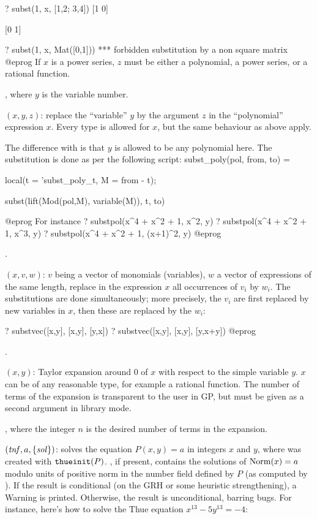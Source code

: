 \bprog
? subst(1, x, [1,2; 3,4])
[1 0]

[0 1]

? subst(1, x, Mat([0,1]))
  ***   forbidden substitution by a non square matrix
@eprog\noindent
If $x$ is a power series, $z$ must be either a polynomial, a power
series, or a rational function.

, where $y$ is the variable number.

$(x,y,z)$:
replace the ``variable'' $y$ by the argument $z$ in the ``polynomial''
expression $x$. Every type is allowed for $x$, but the same behaviour
as  above apply.

The difference with  is that $y$ is allowed to be any polynomial
here. The substitution is done as per the following script:
\bprog
   subst_poly(pol, from, to) =
   { local(t = 'subst_poly_t, M = from - t);

     subst(lift(Mod(pol,M), variable(M)), t, to)
   }
@eprog\noindent
For instance
\bprog
? substpol(x^4 + x^2 + 1, x^2, y)
? substpol(x^4 + x^2 + 1, x^3, y)
? substpol(x^4 + x^2 + 1, (x+1)^2, y)
@eprog

.

$(x,v,w)$: $v$ being a vector of monomials (variables),
$w$ a vector of expressions of the same length, replace in the expression
$x$ all occurrences of $v_i$ by $w_i$. The substitutions are done
simultaneously; more precisely, the $v_i$ are first replaced by new
variables in $x$, then these are replaced by the $w_i$:

\bprog
? substvec([x,y], [x,y], [y,x])
? substvec([x,y], [x,y], [y,x+y])
@eprog

.

$(x,y)$: Taylor expansion around $0$ of $x$ with respect
to\label{se:taylor}
the simple variable $y$. $x$ can be of any reasonable type, for example a
rational function. The number of terms of the expansion is transparent to the
user in GP, but must be given as a second argument in library mode.

, where the  integer $n$ is the desired number of
terms in the expansion.

$(\hbox{\it tnf\/},a,\{\hbox{\it sol\/}\})$: solves the equation
$P(x,y)=a$ in integers $x$ and $y$, where  was created with
${\tt thueinit}(P)$. , if present, contains the solutions of
${\rm Norm}(x)=a$ modulo units of positive norm in the number field
defined by $P$ (as computed by ). If the
result is conditional (on the GRH or some heuristic strengthening),
a Warning is printed. Otherwise, the result is unconditional, barring bugs.
For instance, here's how to solve the Thue equation $x^{13} - 5y^{13} = - 4$:

